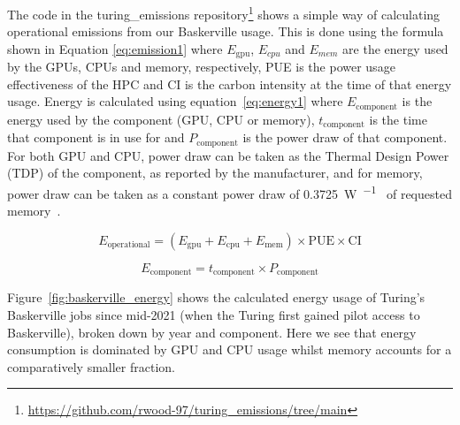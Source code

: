 \documentclass[12pt]{article}
\begin{document}
The code in the turing\_emissions repository\footnote{\url{https://github.com/rwood-97/turing_emissions/tree/main}} shows a simple way of calculating operational emissions from our Baskerville usage.
This is done using the formula shown in Equation \eqref{eq:emission1}
where $E_{\text{gpu}}$, $E_{cpu}$ and $E_{mem}$ are the energy used by
the GPUs, CPUs and memory, respectively, PUE is the power usage
effectiveness of the HPC and CI is the carbon intensity at the time of
that energy usage.  Energy is calculated using
equation~\eqref{eq:energy1} where $E_\text{component}$ is the energy used by
the component (GPU, CPU or memory), $t_\text{component}$ is the time that
component is in use for and $P_\text{component}$ is the power draw of that
component.  For both GPU and CPU, power draw can be taken as the Thermal
Design Power (TDP) of the component, as reported by the manufacturer,
and for memory, power draw can be taken as a constant power draw of
\qty{0.3725}{\watt\per\giga\byte} of requested
memory~\cite{green_algorithms}.

\begin{equation}
E_{\text{operational}} = (E_\text{gpu} + E_\text{cpu} + E_\text{mem}) \times \text{PUE} \times \text{CI}
    \label{eq:emission1}
\end{equation}

\begin{equation}
    E_\text{component} = t_\text{component} \times P_\text{component}
    \label{eq:energy1}
\end{equation}

Figure~\ref{fig:baskerville_energy} shows the calculated energy usage of Turing's Baskerville jobs since mid-2021 (when the Turing first gained pilot access to Baskerville), broken down by year and component. Here we see that energy consumption is dominated by GPU and CPU usage whilst memory accounts for a comparatively smaller fraction.
\end{document}
